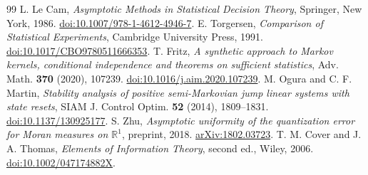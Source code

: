 \begin{thebibliography}{99}
 L. Le Cam, \emph{Asymptotic Methods in Statistical Decision Theory}, Springer, New York, 1986. \href{https://doi.org/10.1007/978-1-4612-4946-7}{doi:10.1007/978-1-4612-4946-7}.
 E. Torgersen, \emph{Comparison of Statistical Experiments}, Cambridge University Press, 1991. \href{https://doi.org/10.1017/CBO9780511666353}{doi:10.1017/CBO9780511666353}.
 T. Fritz, \emph{A synthetic approach to Markov kernels, conditional independence and theorems on sufficient statistics}, Adv. Math. \textbf{370} (2020), 107239. \href{https://doi.org/10.1016/j.aim.2020.107239}{doi:10.1016/j.aim.2020.107239}.
 M. Ogura and C. F. Martin, \emph{Stability analysis of positive semi-Markovian jump linear systems with state resets}, SIAM J. Control Optim. \textbf{52} (2014), 1809--1831. \href{https://doi.org/10.1137/130925177}{doi:10.1137/130925177}.
 S. Zhu, \emph{Asymptotic uniformity of the quantization error for Moran measures on $\mathbb R^1$}, preprint, 2018. \href{https://arxiv.org/abs/1802.03723}{arXiv:1802.03723}.
 T. M. Cover and J. A. Thomas, \emph{Elements of Information Theory}, second ed., Wiley, 2006. \href{https://doi.org/10.1002/047174882X}{doi:10.1002/047174882X}.
\end{thebibliography}
